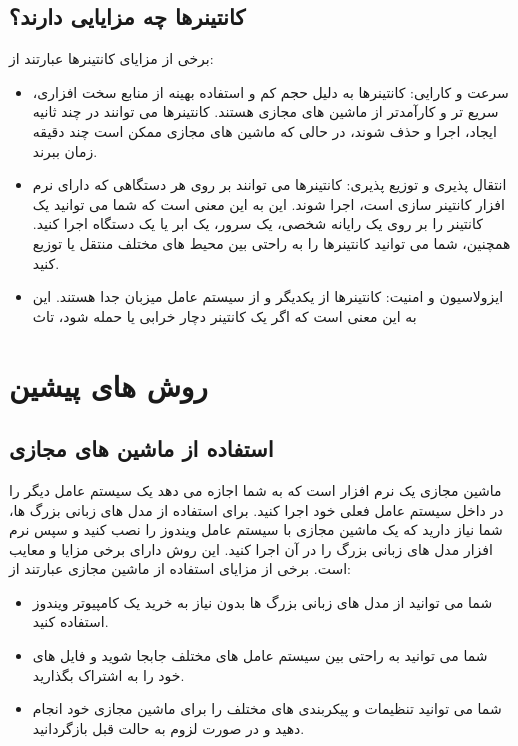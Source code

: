 \subsection{کانتینرها چه مزایایی دارند؟}

برخی از مزایای کانتینرها عبارتند از:
\begin{itemize}[label=-]
\item
سرعت و کارایی: کانتینرها به دلیل حجم کم و استفاده بهینه از منابع سخت افزاری، سریع تر و کارآمدتر از ماشین های مجازی هستند. کانتینرها می توانند در چند ثانیه ایجاد، اجرا و حذف شوند، در حالی که ماشین های مجازی ممکن است چند دقیقه زمان ببرند.
\item
انتقال پذیری و توزیع پذیری: کانتینرها می توانند بر روی هر دستگاهی که دارای نرم افزار کانتینر سازی است، اجرا شوند. این به این معنی است که شما می توانید یک کانتینر را بر روی یک رایانه شخصی، یک سرور، یک ابر یا یک دستگاه  اجرا کنید. همچنین، شما می توانید کانتینرها را به راحتی بین محیط های مختلف منتقل یا توزیع کنید.
\item
ایزولاسیون و امنیت: کانتینرها از یکدیگر و از سیستم عامل میزبان جدا هستند. این به این معنی است که اگر یک کانتینر دچار خرابی یا حمله شود، تاث
\end{itemize}

\section{روش های پیشین}

\subsection{استفاده از ماشین های مجازی}
ماشین مجازی یک نرم افزار است که به شما اجازه می دهد یک سیستم عامل دیگر را در داخل سیستم عامل فعلی خود اجرا کنید. برای استفاده از مدل های زبانی بزرگ ها، شما نیاز دارید که یک ماشین مجازی با سیستم عامل ویندوز را نصب کنید و سپس نرم افزار مدل های زبانی بزرگ را در آن اجرا کنید. این روش دارای برخی مزایا و معایب است. برخی از مزایای استفاده از ماشین مجازی عبارتند از:
\begin{itemize}[label=-]
  \item
 شما می توانید از مدل های زبانی بزرگ ها بدون نیاز به خرید یک کامپیوتر ویندوز استفاده کنید.
 \item
شما می توانید به راحتی بین سیستم عامل های مختلف جابجا شوید و فایل های خود را به اشتراک بگذارید.
\item
 شما می توانید تنظیمات و پیکربندی های مختلف را برای ماشین مجازی خود انجام دهید و در صورت لزوم به حالت قبل بازگردانید.
\end{itemize}

